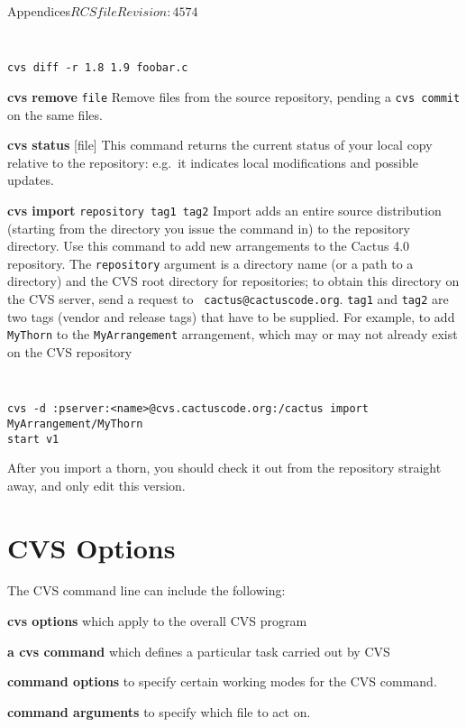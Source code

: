 \begin{cactuspart}{Appendices}{$RCSfile$}{$Revision: 4574 $}
\begin{Lentry}
{\tt
\begin{verbatim}
cvs diff -r 1.8 1.9 foobar.c
\end{verbatim}
}

\item[{\bf cvs remove} {\tt file}]
Remove files from the source repository, pending  a {\tt cvs commit} on
the same files.

\item[{\bf cvs status} {[}file{]}]
This command returns the current status of your local copy relative to
the repository: e.g.\ it indicates local modifications and possible
updates.

\item[{\bf cvs import} {\tt repository tag1 tag2}]
Import adds an entire source distribution (starting from the
directory you issue the command in) to the repository directory.
Use this command to add new arrangements to the Cactus 4.0 repository. The
{\tt repository} argument is a directory name (or a path to a
directory) and the CVS root directory for repositories; to obtain this
directory on the CVS server, send a request to {\tt
cactus@cactuscode.org}. {\tt tag1} and {\tt tag2} are two tags (vendor
 and release tags) that have to be supplied. For example, to add {\tt MyThorn}
to the {\tt MyArrangement} arrangement, which may or may not already exist on
the CVS repository

{\tt
\begin{verbatim}
cvs -d :pserver:<name>@cvs.cactuscode.org:/cactus import MyArrangement/MyThorn
start v1
\end{verbatim}
}

After you import a thorn, you should check it out from the repository straight
away, and only edit this version.

\end{Lentry}

\section{CVS Options}
The CVS command line can include the following:
\begin{Lentry}
\item[{\bf cvs options}] which apply to the overall CVS program
\item[{\bf a cvs command}]  which defines a particular task carried out by
CVS
\item[{\bf command options}] to specify certain working modes for the CVS
command.
\item[{\bf command arguments}] to specify which file to act on.
\end{Lentry}


\end{cactuspart}
